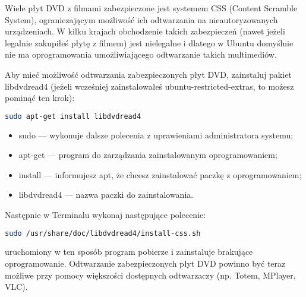 Wiele płyt DVD z filmami zabezpieczone jest systemem CSS (Content Scramble System), ograniczającym możliwość ich odtwarzania na nieautoryzowanych urządzeniach. W kilku krajach obchodzenie takich zabezpieczeń (nawet jeżeli legalnie zakupiłeś płytę z filmem) jest nielegalne i dlatego w Ubuntu domyślnie nie ma oprogramowania umożliwiającego odtwarzanie takich multimediów.

Aby mieć możliwość odtwarzania zabezpieczonych płyt DVD, zainstaluj pakiet \textcolor{ubuntu_orange}{libdvdread4} (jeżeli wcześniej zainstalowałeś ubuntu-restricted-extras, to możesz pominąć ten krok):
\begin{lstlisting}[language=bash]
sudo apt-get install libdvdread4
\end{lstlisting}
\begin{itemize}
\item \textcolor{ubuntu_orange}{sudo} --- wykonuje dalsze polecenia z uprawieniami administratora systemu;
\item \textcolor{ubuntu_orange}{apt-get} --- program do zarządzania zainstalowanym oprogramowaniem;
\item \textcolor{ubuntu_orange}{install} --- informujesz apt, że chcesz zainstalować paczkę z oprogramowaniem;
\item \textcolor{ubuntu_orange}{libdvdread4} --- nazwa paczki do zainstalowania.
\end{itemize}

Następnie w Terminalu wykonaj następujące polecenie:
\begin{lstlisting}[language=bash]
sudo /usr/share/doc/libdvdread4/install-css.sh
\end{lstlisting}
uruchomiony w ten sposób program pobierze i zainstaluje brakujące oprogramowanie. Odtwarzanie zabezpieczonych płyt DVD powinno być teraz możliwe przy pomocy większości dostępnych odtwarzaczy (np. Totem, MPlayer, VLC).
